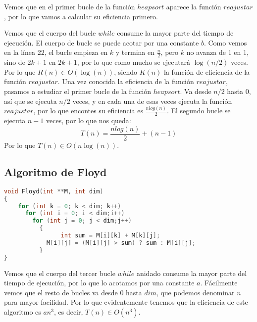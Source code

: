 Vemos que en el primer bucle de la función $heapsort$ aparece la función $reajustar$, por lo que vamos a calcular su eficiencia primero. 

Vemos que el cuerpo del bucle $while$ consume la mayor parte del tiempo de ejecución. El cuerpo de bucle se puede acotar por una constante $b$. Como vemos en la línea 22, el bucle empieza en $k$ y termina en $\frac{n}{2}$, pero $k$ no avanza de 1 en 1, sino de $2k+1$ en $2k+1$, por lo que como mucho se ejecutará $\log(n/2)$ veces. Por lo que $R(n) \in O(\log(n))$, siendo $K(n)$ la función de eficiencia de la función $reajustar$.
Una vez conocida la eficiencia de la función $reajustar$, pasamos a estudiar el primer bucle de la función $heapsort$. Va desde $n/2$ hasta $0$, así que se ejecuta $n/2$ veces, y en cada una de esas veces ejecuta la función $reajustar$, por lo que encontes su eficiencia es $\frac{nlog(n)}{2}$. El segundo bucle se ejecuta $n-1$ veces, por lo que nos queda:
\[T(n)=\frac{nlog(n)}{2}+(n-1)\]
Por lo que $T(n)\in O(n\log(n))$.

\subsection{Algoritmo de Floyd}
\begin{lstlisting}[language=C]
void Floyd(int **M, int dim)
{
	for (int k = 0; k < dim; k++)
	  for (int i = 0; i < dim;i++)
	    for (int j = 0; j < dim;j++)
	      {
				int sum = M[i][k] + M[k][j];    	
		    M[i][j] = (M[i][j] > sum) ? sum : M[i][j];
	      }
}
\end{lstlisting}

Vemos que el cuerpo del tercer bucle $while$ anidado consume la mayor parte del tiempo de ejecución, por lo que lo acotamos por una constante $a$. Fácilmente vemos que el resto de bucles va desde 0 hasta $dim$, que podemos denominar $n$ para mayor facilidad. Por lo que evidentemente tenemos que la eficiencia de este algoritmo es $an^3$, es decir, $T(n)\in O(n^3)$.